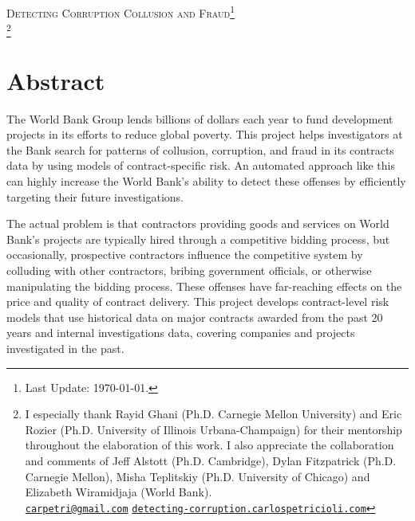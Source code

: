 \newpage
\thispagestyle{plain}
\begin{center}
\scshape \large Detecting Corruption Collusion and Fraud\footnote{ Last Update: \today.}
\\

\scshape \theauthor\footnote{ I especially thank Rayid Ghani (Ph.D. Carnegie Mellon University) and  Eric Rozier (Ph.D. University of Illinois Urbana-Champaign) for their mentorship throughout the elaboration of this work. I also appreciate the collaboration and comments of Jeff Alstott (Ph.D. Cambridge), Dylan Fitzpatrick (Ph.D. Carnegie Mellon), Misha Teplitskiy (Ph.D. University of Chicago) and Elizabeth Wiramidjaja (World Bank).
\\  \href{mailto:carpetri@gmail.com}{\texttt{carpetri@gmail.com}}  \hfill \href{http://detecting-corruption.carlospetricioli.com}{\texttt{detecting-corruption.carlospetricioli.com}} }
\normalsize
\end{center}

\section*{\centering  \normalsize{Abstract} }

\small
\noindent The World Bank Group lends billions of dollars each year to fund development projects in its efforts to reduce global poverty. This project helps investigators at the Bank search for patterns of collusion, corruption, and fraud in its contracts data by using models of contract-specific risk. An automated approach like this can  highly increase the World Bank's ability to detect these offenses by efficiently targeting  their future investigations. 

The actual problem is that contractors providing goods and services on World Bank's projects are typically hired through a competitive bidding process, but occasionally, prospective contractors influence the competitive system by colluding with other contractors, bribing government officials, or otherwise manipulating the bidding process. These offenses have far-reaching effects on the price and quality of contract delivery. This project develops contract-level risk models that use historical data on major contracts awarded from the past 20 years and internal investigations data, covering companies and projects investigated  in the past.

